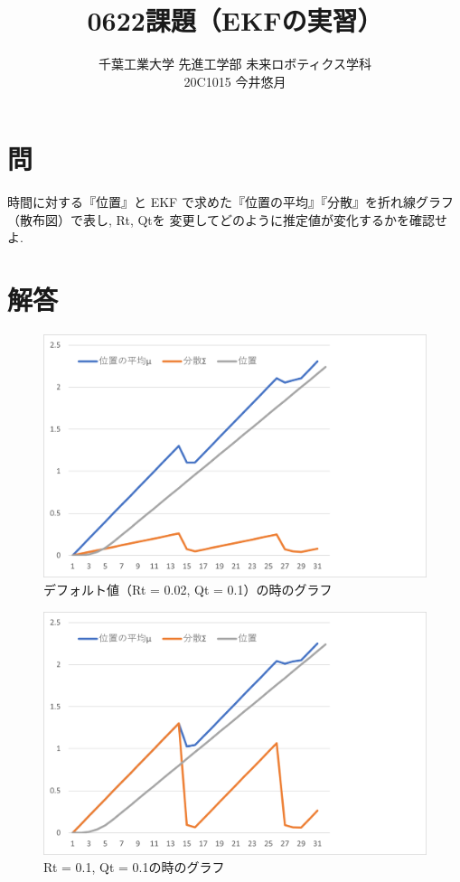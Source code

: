\documentclass{jsarticle}
\begin{document}
\title{{\vspace*{-10mm}}{\LARGE 0622課題（EKFの実習）}}
\author{\large 千葉工業大学 先進工学部 未来ロボティクス学科 \vspace*{4mm}\\20C1015 今井悠月}
\date{}
\maketitle\vspace*{10mm}
\vspace*{-10mm}

\section*{問}
時間に対する『位置』と EKF で求めた『位置の平均』『分散』を折れ線グラフ（散布図）で表し, Rt, Qtを
変更\hspace*{1zw}してどのように推定値が変化するかを確認せよ.

\section*{解答}

\begin{figure}[H]
  \centering
   \includegraphics[scale=0.15]{./fig/def.png}
   \caption{デフォルト値（Rt = 0.02, Qt = 0.1）の時のグラフ}
\end{figure}

\begin{figure}[H]
  \centering
   \includegraphics[scale=0.15]{./fig/R=0.1.png}
   \caption{Rt = 0.1, Qt = 0.1の時のグラフ}
\end{figure}
\end{document}
